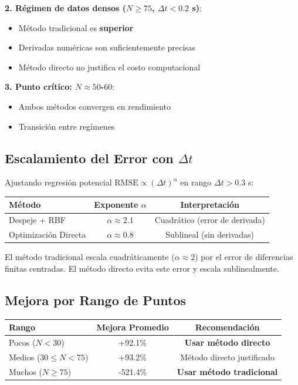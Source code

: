 \documentclass[11pt,a4paper]{article}
\begin{document}
\textbf{2. Régimen de datos densos ($N \geq 75$, $\Delta t < 0.2$ s)}:
\begin{itemize}
\item Método tradicional es \textbf{superior}
\item Derivadas numéricas son suficientemente precisas
\item Método directo no justifica el costo computacional
\end{itemize}

\textbf{3. Punto crítico: $N \approx 50$-$60$}:
\begin{itemize}
\item Ambos métodos convergen en rendimiento
\item Transición entre regímenes
\end{itemize}

\subsection{Escalamiento del Error con $\Delta t$}

Ajustando regresión potencial $\text{RMSE} \propto (\Delta t)^\alpha$ en rango $\Delta t > 0.3$ s:

\begin{table}[H]
\centering
\begin{tabular}{lcc}
\toprule
\textbf{Método} & \textbf{Exponente} $\alpha$ & \textbf{Interpretación} \\
\midrule
Despeje + RBF & $\alpha \approx 2.1$ & Cuadrático (error de derivada) \\
Optimización Directa & $\alpha \approx 0.8$ & Sublineal (sin derivadas) \\
\bottomrule
\end{tabular}
\end{table}

El método tradicional escala cuadráticamente ($\alpha \approx 2$) por el error de diferencias finitas centradas. El método directo evita este error y escala sublinealmente.

\subsection{Mejora por Rango de Puntos}

\begin{table}[H]
\centering
\begin{tabular}{lcc}
\toprule
\textbf{Rango} & \textbf{Mejora Promedio} & \textbf{Recomendación} \\
\midrule
\rowcolor{green!30}
Pocos ($N < 30$) & +92.1\% & \textbf{Usar método directo} \\
\rowcolor{yellow!30}
Medios ($30 \leq N < 75$) & +93.2\% & Método directo justificado \\
\rowcolor{red!30}
Muchos ($N \geq 75$) & -521.4\% & \textbf{Usar método tradicional} \\
\bottomrule
\end{tabular}
\end{table}
\end{document}
